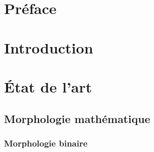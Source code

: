 \documentclass[12pt, twoside, letterpaper, french]{article}
\begin{document}

\addtocounter{page}{-1}

\null
\thispagestyle{empty}
\addtocounter{page}{-1}
\newpage

\thispagestyle{empty}
\section*{Préface}
\vspace{0.4cm}

\addtocounter{page}{-1}
\newpage

\thispagestyle{empty}
\tableofcontents
\addtocounter{page}{-2}
\thispagestyle{empty}
\newpage



\section{Introduction}
\vspace{0.2cm}

\newpage


\section{État de l'art}

\subsection{Morphologie mathématique} %

\subsubsection{Morphologie binaire}
\vspace{0.2cm}

\newpage
\end{document}
